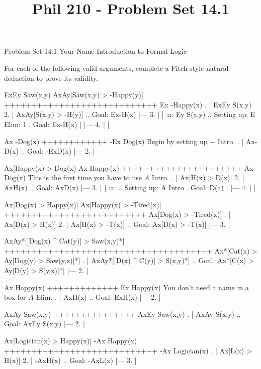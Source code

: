 
\title{Phil 210 - Problem Set 14.1}

\heading
Problem Set 14.1
Your Name
Introduction to Formal Logic
\endheading

For each of the following valid arguments, complete a Fitch-style natural deduction to prove its validity.

\quantifiers
\problems
{}
\argument
 ExEy Saw(x,y)
 AxAy[Saw(x,y) > -Happy(y)]
++++++++++++++++++++++++++++
 Ex -Happy(x)
\endargument
        \answer
        . | ExEy S(x,y)
         2. | AxAy[S(x,y) > -H(y)]  ..  Goal: Ex-H(x)
            |---
         3. |   | :a: Ey S(a,y)     ..  Setting up: E Elim: 1  .  Goal: Ex-H(x)
            |   |---
         4. |   |
        \endfitchproof
        \endanswer

\argument
 Ax -Dog(x)
++++++++++++
 -Ex Dog(x)
\endargument
\Hint Begin by setting up $-$ Intro.
        \answer
        . | Ax-D(x)  ..  Goal: -ExD(x)
            |---
         2. | 
        \endfitchproof
        \endanswer

\argument
 Ax[Happy(x) > Dog(x)
 Ax Happy(x)
++++++++++++++++++++++
 Ax Dog(x)
\endargument
\Hint This is the first time you have to use $A$ Intro.
        \answer
        . | Ax[H(x) > D(x)]
         2. | AxH(x)          ..  Goal: AxD(x)
            |---
         3. |   | :a:          ..  Setting up: A Intro  .  Goal: D(a)
            |   |---
         4. |   |
        \endfitchproof
        \endanswer

\argument
 Ax[Dog(x) > Happy(x)]
 Ax[Happy(x) > -Tired(x)]
++++++++++++++++++++++++++
 Ax[Dog(x) > -Tired(x)]
\endargument
        \answer
        . | Ax[D(x) > H(x)]
         2. | Ax[H(x) > -T(x)]  ..  Goal: Ax[D(x) > -T(x)]
            |---
         3. | 
        \endfitchproof
        \endanswer

\argument
 AxAy*[[Dog(x) ^ Cat(y)] > Saw(x,y)*]
++++++++++++++++++++++++++++++++++++++
 Ax*[Cat(x) > Ay[Dog(y) > Saw(y,x)]*]
\endargument
        \answer
        . | AxAy*[[D(x) ^ C(y)] > S(x,y)*]  ..  Goal: Ax*[C(x) > Ay[D(y) > S(y,x)]*]
            |---
         2. | 
        \endfitchproof
        \endanswer

\argument
 Ax Happy(x)
+++++++++++++
 Ex Happy(x)
\endargument
\Hint You don't need a name in a box for $A$ Elim.
        \answer
        . | AxH(x)  ..  Goal: ExH(x)
            |---
         2. | 
        \endfitchproof
        \endanswer

\argument
 AxAy Saw(x,y)
+++++++++++++++
 AxEy Saw(x,y)
\endargument
        \answer
        . | AxAy S(x,y)  ..  Goal: AxEy S(x,y)
            |---
         2. |
        \endfitchproof
        \endanswer

\argument
 Ax[Logician(x) > Happy(x)]
 -Ax Happy(x)
++++++++++++++++++++++++++++
 -Ax Logician(x)
\endargument
        \answer
        . | Ax[L(x) > H(x)]
         2. | -AxH(x)         ..  Goal: -AxL(x)
            |---
         3. |
        \endfitchproof
        \endanswer

\endproblems
\bye
